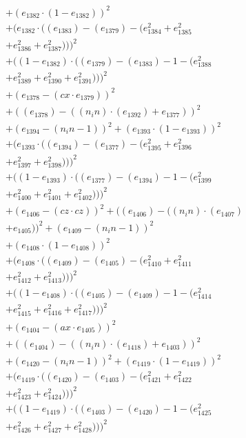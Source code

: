 \documentclass[10pt, a4paper]{article}
\begin{document}
\begin{align*}
& + (e_{1382}  \cdot  (1 - e_{1382}))^{2} \\
& + (e_{1382}  \cdot  ((e_{1383}) - (e_{1379}) - (e_{1384}^{2} + e_{1385}^{2} \\
& + e_{1386}^{2} + e_{1387}^{2})))^{2} \\
& + ((1 - e_{1382})  \cdot  ((e_{1379}) - (e_{1383}) - 1 - (e_{1388}^{2} \\
& + e_{1389}^{2} + e_{1390}^{2} + e_{1391}^{2})))^{2} \\
& + (e_{1378} - (cx  \cdot  e_{1379}))^{2} \\
& + ((e_{1378}) - ((n_in)  \cdot  (e_{1392}) + e_{1377}))^{2} \\
& + (e_{1394} - (n_in - 1))^{2} + (e_{1393}  \cdot  (1 - e_{1393}))^{2} \\
& + (e_{1393}  \cdot  ((e_{1394}) - (e_{1377}) - (e_{1395}^{2} + e_{1396}^{2} \\
& + e_{1397}^{2} + e_{1398}^{2})))^{2} \\
& + ((1 - e_{1393})  \cdot  ((e_{1377}) - (e_{1394}) - 1 - (e_{1399}^{2} \\
& + e_{1400}^{2} + e_{1401}^{2} + e_{1402}^{2})))^{2} \\
& + (e_{1406} - (cz  \cdot  cz))^{2} + ((e_{1406}) - ((n_in)  \cdot  (e_{1407}) \\
& + e_{1405}))^{2} + (e_{1409} - (n_in - 1))^{2} \\
& + (e_{1408}  \cdot  (1 - e_{1408}))^{2} \\
& + (e_{1408}  \cdot  ((e_{1409}) - (e_{1405}) - (e_{1410}^{2} + e_{1411}^{2} \\
& + e_{1412}^{2} + e_{1413}^{2})))^{2} \\
& + ((1 - e_{1408})  \cdot  ((e_{1405}) - (e_{1409}) - 1 - (e_{1414}^{2} \\
& + e_{1415}^{2} + e_{1416}^{2} + e_{1417}^{2})))^{2} \\
& + (e_{1404} - (ax  \cdot  e_{1405}))^{2} \\
& + ((e_{1404}) - ((n_in)  \cdot  (e_{1418}) + e_{1403}))^{2} \\
& + (e_{1420} - (n_in - 1))^{2} + (e_{1419}  \cdot  (1 - e_{1419}))^{2} \\
& + (e_{1419}  \cdot  ((e_{1420}) - (e_{1403}) - (e_{1421}^{2} + e_{1422}^{2} \\
& + e_{1423}^{2} + e_{1424}^{2})))^{2} \\
& + ((1 - e_{1419})  \cdot  ((e_{1403}) - (e_{1420}) - 1 - (e_{1425}^{2} \\
& + e_{1426}^{2} + e_{1427}^{2} + e_{1428}^{2})))^{2} \\

\end{align*}
\end{document}
